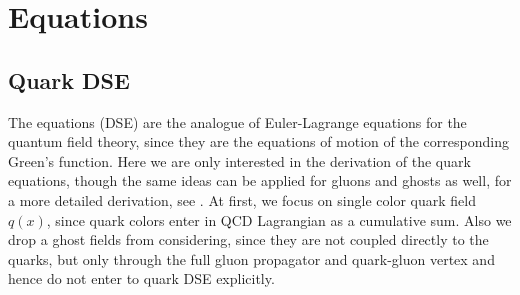 \chapter{\DS Equations}
\label{chap:DSE}

\section{Quark DSE}
The \DS equations (DSE) are the analogue of Euler-Lagrange equations for the quantum field theory, since they are the equations of motion of the corresponding Green's function. Here we are only interested in the derivation of the quark \DS equations, though the same ideas can be applied for gluons and ghosts as well, for a more detailed derivation, see \cite{Roberts:1994dr}. At first, we focus on single color quark field $q(x)$, since quark colors enter in QCD Lagrangian as a cumulative sum. Also we drop a ghost fields from considering, since they are not coupled directly to the quarks, but only through the full gluon propagator and quark-gluon vertex and hence do not enter to quark DSE explicitly.  \\


